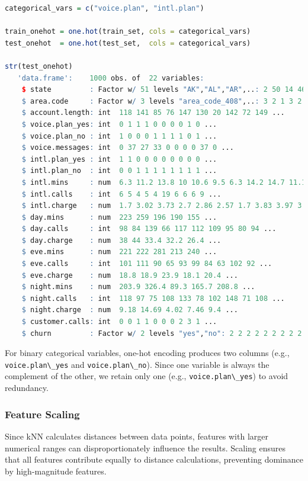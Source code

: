 \documentclass[
  11pt,
]{book}
\newcommand{\passthrough}[1]{#1}
\theoremstyle{definition}
\theoremstyle{definition}
\theoremstyle{definition}
\theoremstyle{definition}
\theoremstyle{remark}
\begin{document}
\begin{lstlisting}[language=R]
categorical_vars = c("voice.plan", "intl.plan")

train_onehot = one.hot(train_set, cols = categorical_vars)
test_onehot  = one.hot(test_set,  cols = categorical_vars)

str(test_onehot)
   'data.frame':    1000 obs. of  22 variables:
    $ state         : Factor w/ 51 levels "AK","AL","AR",..: 2 50 14 46 10 4 25 15 11 32 ...
    $ area.code     : Factor w/ 3 levels "area_code_408",..: 3 2 1 3 2 2 2 2 2 1 ...
    $ account.length: int  118 141 85 76 147 130 20 142 72 149 ...
    $ voice.plan_yes: int  0 1 1 1 0 0 0 0 1 0 ...
    $ voice.plan_no : int  1 0 0 0 1 1 1 1 0 1 ...
    $ voice.messages: int  0 37 27 33 0 0 0 0 37 0 ...
    $ intl.plan_yes : int  1 1 0 0 0 0 0 0 0 0 ...
    $ intl.plan_no  : int  0 0 1 1 1 1 1 1 1 1 ...
    $ intl.mins     : num  6.3 11.2 13.8 10 10.6 9.5 6.3 14.2 14.7 11.1 ...
    $ intl.calls    : int  6 5 4 5 4 19 6 6 6 9 ...
    $ intl.charge   : num  1.7 3.02 3.73 2.7 2.86 2.57 1.7 3.83 3.97 3 ...
    $ day.mins      : num  223 259 196 190 155 ...
    $ day.calls     : int  98 84 139 66 117 112 109 95 80 94 ...
    $ day.charge    : num  38 44 33.4 32.2 26.4 ...
    $ eve.mins      : num  221 222 281 213 240 ...
    $ eve.calls     : int  101 111 90 65 93 99 84 63 102 92 ...
    $ eve.charge    : num  18.8 18.9 23.9 18.1 20.4 ...
    $ night.mins    : num  203.9 326.4 89.3 165.7 208.8 ...
    $ night.calls   : int  118 97 75 108 133 78 102 148 71 108 ...
    $ night.charge  : num  9.18 14.69 4.02 7.46 9.4 ...
    $ customer.calls: int  0 0 1 1 0 0 0 2 3 1 ...
    $ churn         : Factor w/ 2 levels "yes","no": 2 2 2 2 2 2 2 2 2 2 ...
\end{lstlisting}

For binary categorical variables, one-hot encoding produces two columns (e.g., \passthrough{\lstinline!voice.plan\_yes!} and \passthrough{\lstinline!voice.plan\_no!}). Since one variable is always the complement of the other, we retain only one (e.g., \passthrough{\lstinline!voice.plan\_yes!}) to avoid redundancy.

\subsubsection*{Feature Scaling}\label{feature-scaling-2}


Since kNN calculates distances between data points, features with larger numerical ranges can disproportionately influence the results. Scaling ensures that all features contribute equally to distance calculations, preventing dominance by high-magnitude features.
\end{document}
